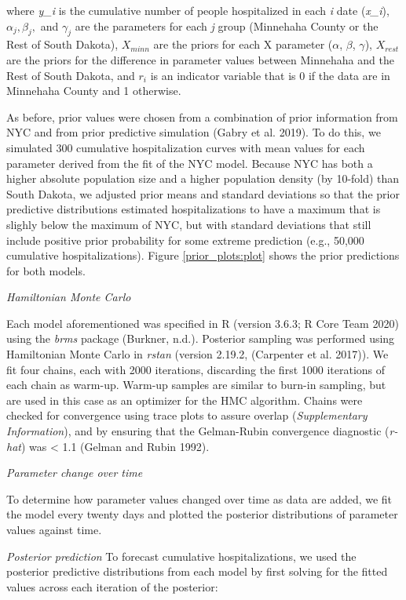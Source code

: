 \documentclass[
]{article}
\begin{document}
where \emph{y\_i} is the cumulative number of people hospitalized in each \emph{i} date (\emph{x\_i}), \(\alpha_j, \beta_j,\) and \(\gamma_j\) are the parameters for each \emph{j} group (Minnehaha County or the Rest of South Dakota), \(X_{minn}\) are the priors for each X parameter (\(\alpha\), \(\beta\), \(\gamma\)), \(X_{rest}\) are the priors for the difference in parameter values between Minnehaha and the Rest of South Dakota, and \(r_i\) is an indicator variable that is 0 if the data are in Minnehaha County and 1 otherwise.

As before, prior values were chosen from a combination of prior information from NYC and from prior predictive simulation (Gabry et al. 2019). To do this, we simulated 300 cumulative hospitalization curves with mean values for each parameter derived from the fit of the NYC model. Because NYC has both a higher absolute population size and a higher population density (by 10-fold) than South Dakota, we adjusted prior means and standard deviations so that the prior predictive distributions estimated hospitalizations to have a maximum that is slighly below the maximum of NYC, but with standard deviations that still include positive prior probability for some extreme prediction (e.g., 50,000 cumulative hospitalizations). Figure \ref{prior_plots:plot} shows the prior predictions for both models.

\emph{Hamiltonian Monte Carlo}

Each model aforementioned was specified in R (version 3.6.3; R Core Team 2020) using the \emph{brms} package (Burkner, n.d.). Posterior sampling was performed using Hamiltonian Monte Carlo in \emph{rstan} (version 2.19.2, (Carpenter et al. 2017)). We fit four chains, each with 2000 iterations, discarding the first 1000 iterations of each chain as warm-up. Warm-up samples are similar to burn-in sampling, but are used in this case as an optimizer for the HMC algorithm. Chains were checked for convergence using trace plots to assure overlap (\emph{Supplementary Information}), and by ensuring that the Gelman-Rubin convergence diagnostic (\emph{r-hat}) was \textless{} 1.1 (Gelman and Rubin 1992).

\emph{Parameter change over time}

To determine how parameter values changed over time as data are added, we fit the model every twenty days and plotted the posterior distributions of parameter values against time.

\emph{Posterior prediction}
To forecast cumulative hospitalizations, we used the posterior predictive distributions from each model by first solving for the fitted values across each iteration of the posterior:
\end{document}
